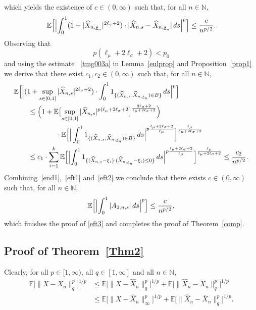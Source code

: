 \documentclass[11pt]{amsart}
\newcommand{\N}{{\mathbb N}}
\newcommand{\EE}{{\mathbb E}}
\newcommand{\eul}{{\widehat X}}
\newcommand{\ind}{1}
\newcommand{\usn}{\underline {s}_n}
\theoremstyle{plain}
\theoremstyle{definition}
\begin{document}
which yields the existence of $c\in (0,\infty)$ such that, for all $n\in\N$,
\begin{equation}\label{eft1}
	\EE\Bigl[ \Bigl|\int_0^1(1+|\eul_{n,\usn}|^{2\ell_\sigma+2})\cdot |\eul_{n,s}-\eul_{n,\usn} |\, ds\Bigr|^p\Bigr] \le \frac{c}{n^{p/2} }.
	\end{equation}
Observing that
\[
p(\ell_\mu + 2\ell_\sigma +2) < p_0
\]
and using the estimate ~\eqref{tmg003a} in Lemma~\ref{eulprop}  and Proposition~\ref{prop1}   we derive that there exist $c_1,c_2\in (0,\infty)$ such that, for all $n\in\N$,
\begin{equation}\label{eft2}
	\begin{aligned}
& \EE\Bigl[ \Bigl|(1+\sup_{s\in [0,1]}|\eul_{n,s}|^{2\ell_\sigma+2})\cdot  \int_0^1 1_{\{(\eul_{n,s}, \eul_{n,\usn})\in B\}}\, ds\Bigr|^p\Bigr]\\
& \qquad \le \Bigl(1+\EE\bigl[\sup_{s\in [0,1]}|\eul_{n,s}|^{p(\ell_\mu +2\ell_\sigma+2}\bigr]^\frac{2\ell_\sigma+2}{\ell_\mu+2\ell_\sigma+2}\Bigr) \\
& \qquad\qquad\qquad\cdot \EE\Bigl[\Bigr| \int_0^1 1_{\{(\eul_{n,s}, \eul_{n,\usn})\in B\}}\, ds\Bigr|^{p\frac{\ell_\mu+2\ell_\sigma+2}{\ell_\mu}}\Bigr]^{\frac{\ell_\mu}{\ell_\mu+2\ell_\sigma+2}} \\
& \qquad \le c_1\cdot \sum_{i=1}^k \EE\Bigl[\Bigl|\int_0^1\ind_{\{(\eul_{n,s}-\xi_i)\cdot (\eul_{n,\usn}-\xi_i)\leq 0\}}\, ds\Bigr|^{p\frac{\ell_\mu+2\ell_\sigma+2}{\ell_\mu}}\Bigr]^{\frac{\ell_\mu}{\ell_\mu+2\ell_\sigma+2}} \le  \frac{c_2}{n^{p/2} }.
	\end{aligned}
\end{equation}
Combining~\eqref{end1},~\eqref{eft1} and~\eqref{eft2} we conclude that there exists $c\in (0,\infty)$ such that, for all $n\in\N$,
\[
 \EE\Bigl[ \Bigl|	\int_0^1 |A_{2,n,s}|\, ds\Bigr|^p\Bigr]\le  \frac{c}{n^{p/2} },
\]
which finishes the proof of \eqref{eft3} and completes the proof of Theorem~\ref{comp}.






\subsection{Proof of Theorem~\ref{Thm2}}\label{4.5}
Clearly, for all $p\in [1,\infty)$, all $q\in [1,\infty]$ and all $n\in\N$,
\begin{equation}\label{two0}
\begin{aligned}
\EE\bigl[\|X-\overline X_n\|_q^p\bigr]^{1/p}
& \le \EE\bigl[\|X-\eul_n\|_q^p\bigr]^{1/p} +\EE\bigl[\|\eul_n-\overline X_n\|_q^p\bigr]^{1/p}\\
& \le \EE\bigl[\|X-\eul_n\|_\infty^p\bigr]^{1/p} +\EE\bigl[\|\eul_n-\overline X_n\|_q^p\bigr]^{1/p}.
\end{aligned}
\end{equation}
\end{document}
